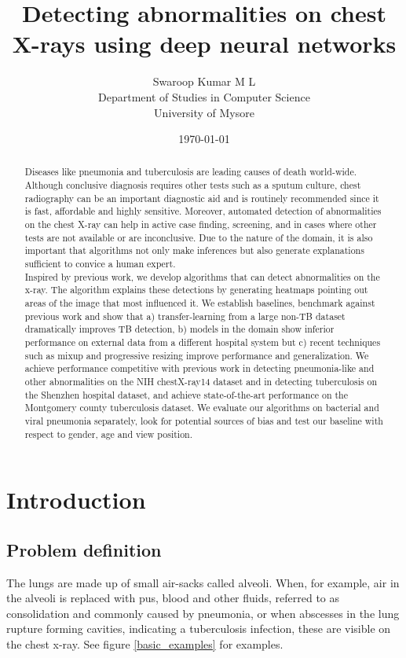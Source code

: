 \documentclass[12pt,twoside,a4paper]{report}
\title{Detecting abnormalities on chest X-rays using deep neural networks}
\author{
  Swaroop Kumar M L\\
  Department of Studies in Computer Science\\
  University of Mysore
}
\date{\today}
\begin{document}
\maketitle
\begin{abstract}
  Diseases like pneumonia and tuberculosis are leading causes of death
  world-wide. Although conclusive diagnosis requires other tests such as a
  sputum culture, chest radiography can be an important diagnostic aid and is
  routinely recommended since it is fast, affordable and highly sensitive.
  Moreover, automated detection of abnormalities on the chest X-ray can help in
  active case finding, screening, and in cases where other tests are not
  available or are inconclusive. Due to the nature of the domain, it is also
  important that algorithms not only make inferences
  but also generate explanations sufficient to convice a human expert.\\

  Inspired by previous work, we develop algorithms that can detect abnormalities
  on the x-ray. The algorithm explains these detections by generating heatmaps
  pointing out areas of the image that most influenced it. We establish
  baselines, benchmark against previous work and show that a) transfer-learning
  from a large non-TB dataset dramatically improves TB detection, b) models in
  the domain show inferior performance on external data from a different
  hospital system but c) recent techniques such as mixup and progressive
  resizing improve performance and generalization. We achieve performance
  competitive with previous work in detecting pneumonia-like and other
  abnormalities on the NIH chestX-ray14 dataset and in detecting tuberculosis on
  the Shenzhen hospital dataset, and achieve state-of-the-art performance on the
  Montgomery county tuberculosis dataset. We evaluate our algorithms on
  bacterial and viral pneumonia separately, look for potential sources of bias
  and test our baseline with respect to gender, age and view position.
\end{abstract}
\tableofcontents
\chapter{Introduction}
\section{Problem definition}
The lungs are made up of small air-sacks called alveoli. When, for example, air
in the alveoli is replaced with pus, blood and other fluids, referred to as
consolidation and commonly caused by pneumonia, or when abscesses in the lung
rupture forming cavities, indicating a tuberculosis infection, these are
visible on the chest x-ray. See figure \ref{basic_examples} for examples.\\
\end{document}
